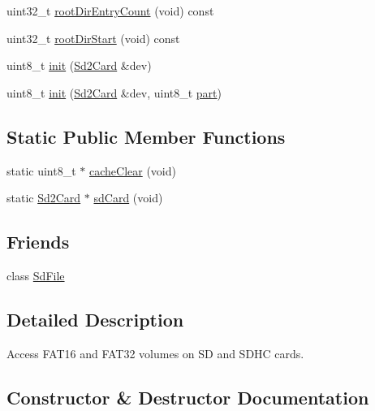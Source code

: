 \begin{DoxyCompactItemize}
\item 
uint32\+\_\+t \hyperlink{class_sd_volume_addfdd68b9d9f728ac29d38f78c3fbead}{root\+Dir\+Entry\+Count} (void) const
\item 
uint32\+\_\+t \hyperlink{class_sd_volume_aeb10811341acc97f7ccda2394c777072}{root\+Dir\+Start} (void) const
\item 
uint8\+\_\+t \hyperlink{class_sd_volume_a037defc7dc23b38ee7ddf7b5273aea5a}{init} (\hyperlink{class_sd2_card}{Sd2\+Card} \&dev)
\item 
uint8\+\_\+t \hyperlink{class_sd_volume_a51d8b4c5dd7372eb7dec486472139eb5}{init} (\hyperlink{class_sd2_card}{Sd2\+Card} \&dev, uint8\+\_\+t \hyperlink{_fat_structs_8h_aa65f87792f271fc6cfa70980af6ac3dd}{part})
\end{DoxyCompactItemize}
\subsection*{Static Public Member Functions}
\begin{DoxyCompactItemize}
\item 
static uint8\+\_\+t $\ast$ \hyperlink{class_sd_volume_aaf5b7f148ad45424bf6d20af4f082a13}{cache\+Clear} (void)
\item 
static \hyperlink{class_sd2_card}{Sd2\+Card} $\ast$ \hyperlink{class_sd_volume_a6bc465a30e167d8d440eb3cda194ee79}{sd\+Card} (void)
\end{DoxyCompactItemize}
\subsection*{Friends}
\begin{DoxyCompactItemize}
\item 
class \hyperlink{class_sd_volume_ad89809cf54bdf885b0505e5edeff2049}{Sd\+File}
\end{DoxyCompactItemize}


\subsection{Detailed Description}
Access F\+A\+T16 and F\+A\+T32 volumes on SD and S\+D\+HC cards. 

\subsection{Constructor \& Destructor Documentation}
\mbox{\label{class_sd_volume_a1843d58062920d6d0e122892ffa42923}} 
